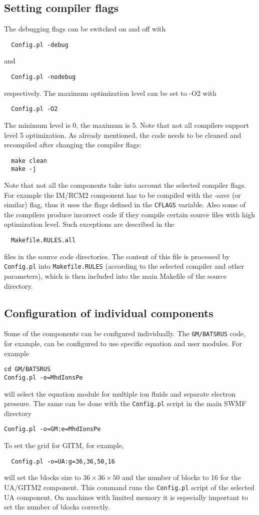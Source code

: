 \subsection{Setting compiler flags}

The debugging flags can be switched on and off with
\begin{verbatim}
  Config.pl -debug
\end{verbatim}
and
\begin{verbatim}
  Config.pl -nodebug
\end{verbatim}
respectively. The maximum optimization level can be set to -O2 with
\begin{verbatim}
  Config.pl -O2
\end{verbatim}
The minimum level is 0, the maximum is 5. Note that not all compilers support
level 5 optimization. As already mentioned, the code needs to be cleaned 
and recompiled after changing the compiler flags:
\begin{verbatim}
  make clean
  make -j
\end{verbatim}
Note that not all the components take into account the selected
compiler flags. For example the IM/RCM2 component has to be compiled 
with the -save (or similar) flag, thus it uses the flags defined in the 
{\tt CFLAGS} variable. Also some of the compilers produce incorrect
code if they compile certain source files with high optimization level.
Such exceptions are described in the 
\begin{verbatim}
  Makefile.RULES.all
\end{verbatim}
files in the source code directories. The content of this file
is processed by {\tt Config.pl} into {\tt Makefile.RULES}
(according to the selected compiler and other parameters),  
which is then included into the main Makefile of the source
directory.

\subsection{Configuration of individual components}

Some of the components can be configured individually. 
The {\tt GM/BATSRUS} code, for example, can be configured to
use specific equation and user modules.
For example
\begin{verbatim}
cd GM/BATSRUS
Config.pl -e=MhdIonsPe
\end{verbatim}
will select the equation module for multiple ion fluids and separate
electron pressure. The same can be done with the {\tt Config.pl} script
in the main SWMF directory
\begin{verbatim}
Config.pl -o=GM:e=MhdIonsPe
\end{verbatim}
To set the grid for GITM, for example, 
\begin{verbatim}
  Config.pl -o=UA:g=36,36,50,16
\end{verbatim}
will set the blocks size to $36\times 36\times 50$ and the number of blocks to 
16 for the UA/GITM2 component. This command runs the {\tt Config.pl}
script of the selected UA component. 
On machines with limited memory it is especially important to
set the number of blocks correctly. 

